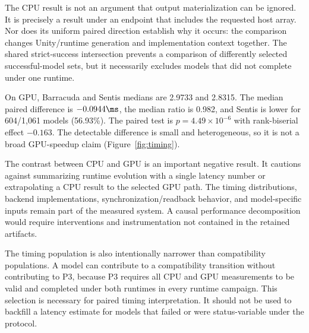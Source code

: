The CPU result is not an argument that output materialization can be ignored. It is precisely a result under an endpoint that includes the requested host array. Nor does its uniform paired direction establish why it occurs: the comparison changes Unity/runtime generation and implementation context together. The shared strict-success intersection prevents a comparison of differently selected successful-model sets, but it necessarily excludes models that did not complete under one runtime.

On GPU, Barracuda and Sentis medians are 2.9733\ms{} and 2.8315\ms. The median paired difference is $-0.0944\ms$, the median ratio is 0.982, and Sentis is lower for 604/1,061 models (56.93\%). The paired test is $p=4.49\times10^{-6}$ with rank-biserial effect $-0.163$. The detectable difference is small and heterogeneous, so it is not a broad GPU-speedup claim (Figure~\ref{fig:timing}).

The contrast between CPU and GPU is an important negative result. It cautions against summarizing runtime evolution with a single latency number or extrapolating a CPU result to the selected GPU path. The timing distributions, backend implementations, synchronization/readback behavior, and model-specific inputs remain part of the measured system. A causal performance decomposition would require interventions and instrumentation not contained in the retained artifacts.

The timing population is also intentionally narrower than compatibility populations. A model can contribute to a compatibility transition without contributing to P3, because P3 requires all CPU and GPU measurements to be valid and completed under both runtimes in every runtime campaign. This selection is necessary for paired timing interpretation. It should not be used to backfill a latency estimate for models that failed or were status-variable under the protocol.

\TimingFigure

\begin{table}[t]
\centering
\caption{Paired completion-aware timing in P3 ($n=1{,}061$). Medians are per-model runtime-campaign-mean summaries; ratios are per-model B/A ratios.}
\label{tab:timing}
\scriptsize
{}
\end{table}

